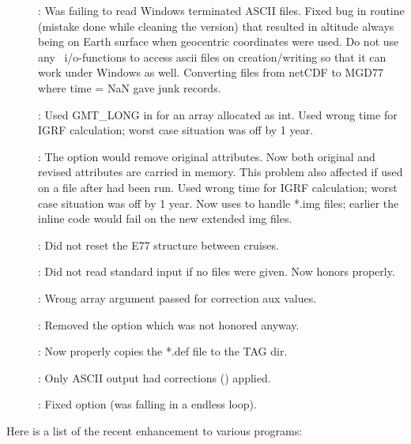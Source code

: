 \begin{description}
	\item []: Was failing to read Windows terminated ASCII files.
		Fixed bug in  routine (mistake done while cleaning the
		 version) that resulted in altitude always being on Earth surface
		when geocentric coordinates were used.  Do not use any \GMT\ i/o-functions to access ascii files on
		creation/writing so that it can work under Windows as well.
		Converting files from netCDF to MGD77 where time = NaN gave junk records.
	\item []: Used GMT\_LONG in  for an array allocated as int.
		Used wrong time for IGRF calculation; worst case situation was off by 1 year.
	\item []: The  option would remove original attributes.  Now
		both original and revised attributes are carried in memory.
		This problem also affected   if used on a
		file after   had been run.
		Used wrong time for IGRF calculation; worst case situation was off by 1 year.
		Now uses  to handle *.img files; earlier the inline code would fail on the new extended img files.
	\item []: Did not reset the E77 structure between cruises.
	\item []: Did not read standard input if no files were given.  Now honors  properly.
	\item []: Wrong array argument passed for correction aux values.
	\item []: Removed the  option which was not honored anyway.
	\item []: Now properly copies the *.def file to the TAG dir.
	\item []: Only ASCII output had corrections () applied.
	\item []: Fixed  option (was falling in a endless loop).
\end{description}

Here is a list of the recent enhancement to various programs:

